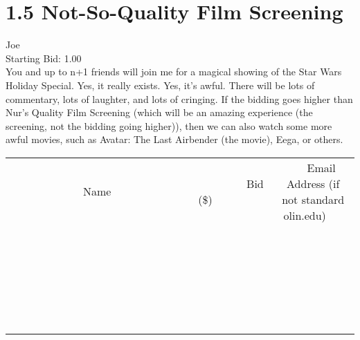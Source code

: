 \documentclass[11pt]{article}
\begin{document}
					\section*{1.5 Not-So-Quality Film Screening}
					Joe \\
					Starting Bid: 1.00 \\
					You and up to n+1 friends will join me for a magical showing of the Star Wars Holiday Special. Yes, it really exists. Yes, it's awful. There will be lots of commentary, lots of laughter, and lots of cringing. If the bidding goes higher than Nur's Quality Film Screening (which will be an amazing experience (the screening, not the bidding going higher)), then we can also watch some more awful movies, such as Avatar: The Last Airbender (the movie), Eega, or others. \\
					[6ex]
					\begin{tabular}{c c c}
						~~~~~~~~~~~~~Name~~~~~~~~~~~~~ & ~~~~~~~~~Bid (\$)~~~~~~~~~ & ~~~Email Address (if not standard olin.edu)~~~ \\
				
 & & \\
\hline
 & & \\
\hline
 & & \\
\hline
 & & \\
\hline
 & & \\
\hline
 & & \\
\hline
 & & \\
\hline
 & & \\
\hline
 & & \\
\hline
 & & \\
\hline
 & & \\
\hline
 & & \\
\hline
 & & \\
\hline
 & & \\
\hline
 & & \\
\hline
 & & \\
\hline
 & & \\
\hline
 & & \\
\hline
 & & \\
\hline
 & & \\
\hline
 & & \\
\hline
 & & \\
\hline
 & & \\
\hline
 & & \\
\hline
 & & \\
\hline
 & & \\
\hline
					\end{tabular}
					\clearpage
				
\end{document}
